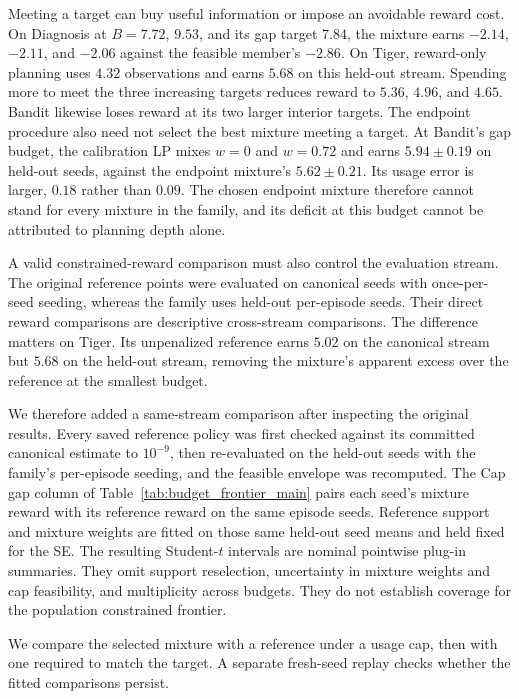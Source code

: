 \documentclass[runningheads]{llncs}
\begin{document}
Meeting a target can buy useful information or impose an avoidable reward cost. On Diagnosis at $B{=}7.72$, $9.53$, and its gap target $7.84$, the mixture earns $-2.14$, $-2.11$, and $-2.06$ against the feasible member's $-2.86$. On Tiger, reward-only planning uses $4.32$ observations and earns $5.68$ on this held-out stream. Spending more to meet the three increasing targets reduces reward to $5.36$, $4.96$, and $4.65$. Bandit likewise loses reward at its two larger interior targets. The endpoint procedure also need not select the best mixture meeting a target. At Bandit's gap budget, the calibration LP mixes $w{=}0$ and $w{=}0.72$ and earns $5.94\pm0.19$ on held-out seeds, against the endpoint mixture's $5.62\pm0.21$. Its usage error is larger, $0.18$ rather than $0.09$. The chosen endpoint mixture therefore cannot stand for every mixture in the family, and its deficit at this budget cannot be attributed to planning depth alone.

A valid constrained-reward comparison must also control the evaluation stream. The original reference points were evaluated on canonical seeds with once-per-seed seeding, whereas the family uses held-out per-episode seeds. Their direct reward comparisons are descriptive cross-stream comparisons. The difference matters on Tiger. Its unpenalized reference earns $5.02$ on the canonical stream but $5.68$ on the held-out stream, removing the mixture's apparent excess over the reference at the smallest budget.

We therefore added a same-stream comparison after inspecting the original results. Every saved reference policy was first checked against its committed canonical estimate to $10^{-9}$, then re-evaluated on the held-out seeds with the family's per-episode seeding, and the feasible envelope was recomputed. The Cap gap column of Table~\ref{tab:budget_frontier_main} pairs each seed's mixture reward with its reference reward on the same episode seeds. Reference support and mixture weights are fitted on those same held-out seed means and held fixed for the SE. The resulting Student-$t$ intervals are nominal pointwise plug-in summaries. They omit support reselection, uncertainty in mixture weights and cap feasibility, and multiplicity across budgets. They do not establish coverage for the population constrained frontier.

We compare the selected mixture with a reference under a usage cap, then with one required to match the target. A separate fresh-seed replay checks whether the fitted comparisons persist.
\end{document}
